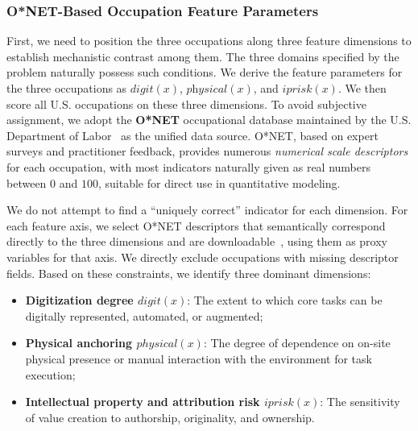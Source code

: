 \subsubsection{O*NET-Based Occupation Feature Parameters}
First, we need to position the three occupations along three feature dimensions to establish mechanistic contrast among them. The three domains specified by the problem naturally possess such conditions. We derive the feature parameters for the three occupations as $\textit{digit}(x)$, $\textit{physical}(x)$, and $\textit{iprisk}(x)$. We then score all U.S. occupations on these three dimensions. To avoid subjective assignment, we adopt the \textbf{O*NET} occupational database maintained by the U.S. Department of Labor~\cite{onet2025database} as the unified data source.
O*NET, based on expert surveys and practitioner feedback, provides numerous \emph{numerical scale descriptors} for each occupation, with most indicators naturally given as real numbers between $0$ and $100$, suitable for direct use in quantitative modeling.

We do not attempt to find a ``uniquely correct'' indicator for each dimension. For each feature axis, we select O*NET descriptors that semantically correspond directly to the three dimensions and are downloadable~\cite{onet2025database}, using them as proxy variables for that axis. We directly exclude occupations with missing descriptor fields.
Based on these constraints, we identify three dominant dimensions:
\begin{itemize}
    \item \textbf{Digitization degree $digit(x)$}: The extent to which core tasks can be digitally represented, automated, or augmented;
    \item \textbf{Physical anchoring $physical(x)$}: The degree of dependence on on-site physical presence or manual interaction with the environment for task execution;
    \item \textbf{Intellectual property and attribution risk $iprisk(x)$}: The sensitivity of value creation to authorship, originality, and ownership.
\end{itemize}


